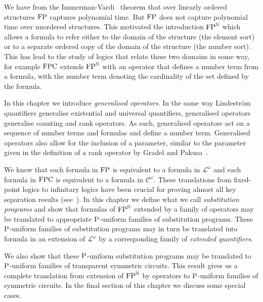 \documentclass[../main/thesis.tex]{subfiles}
\begin{document}
We have from the Immerman-Vardi~\cite{} theorem that over linearly ordered
structures $\text{\upshape FP}$ captures polynomial time. But $\text{\upshape FP}$ does not capture polynomial
time over unordered structures. This motivated the introduction $\text{\upshape FP}^{\mathbb{N}}$
which allows a formula to refer either to the domain of the structure (the
element sort) or to a separate ordered copy of the domain of the structure (the
number sort). This has lead to the study of logics that relate these two domains
in some way, for example $\text{\upshape FPC}$ extends $\text{\upshape FP}^{\mathbb{N}}$ with an operator that
defines a number term from a formula, with the number term denoting the
cardinality of the set defined by the formula.

In this chapter we introduce \emph{generalised operators}. In the same way
Lindestr\"{o}m quantifiers generalise existential and universal quantifiers,
generalised operators generalise counting and rank operators. As such,
generalised operators act on a sequence of number terms and formulas and define
a number term. Generalised operators also allow for the inclusion of a
parameter, similar to the parameter given in the definition of a rank operator
by Gradel and Pakusa~\cite{}.

We know that each formula in $\text{\upshape FP}$ is equivalent to a formula in
$\mathcal{L}^{\omega}$ and each formula in $\text{\upshape FPC}$ is equivalent to a formula in
$\mathcal{C}^{\omega}$. These translations from fixed-point logics to infinitary
logics have been crucial for proving almost all key separation results
(see~\cite{}). In this chapter we define what we call \emph{substitution
  programs} and show that formulas of $\text{\upshape FP}^{\mathbb{N}}$ extended by a family of
operators may be translated to appropriate $\mathrm{P}$-uniform families of
substitution programs. These $\mathrm{P}$-uniform families of substitution programs may
in turn be translated into formula in an extension of $\mathcal{L}^{\omega}$ by
a corresponding family of \emph{extended quantifiers}.

We also show that these $\mathrm{P}$-uniform substitution programs may be translated to
$\mathrm{P}$-uniform families of transparent symmetric circuits. This result gives us a
complete translation from extension of $\text{\upshape FP}^{\mathbb{N}}$ by operators to
$\mathrm{P}$-uniform families of symmetric circuits. In the final section of this
chapter we discuss some special cases.






\end{document}
